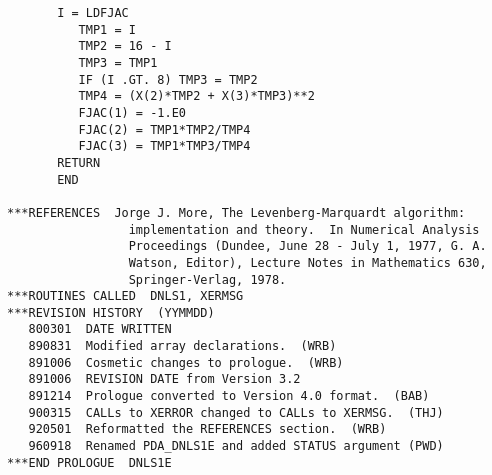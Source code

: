 \begin{verbatim}
       I = LDFJAC
          TMP1 = I
          TMP2 = 16 - I
          TMP3 = TMP1
          IF (I .GT. 8) TMP3 = TMP2
          TMP4 = (X(2)*TMP2 + X(3)*TMP3)**2
          FJAC(1) = -1.E0
          FJAC(2) = TMP1*TMP2/TMP4
          FJAC(3) = TMP1*TMP3/TMP4
       RETURN
       END

***REFERENCES  Jorge J. More, The Levenberg-Marquardt algorithm:
                 implementation and theory.  In Numerical Analysis
                 Proceedings (Dundee, June 28 - July 1, 1977, G. A.
                 Watson, Editor), Lecture Notes in Mathematics 630,
                 Springer-Verlag, 1978.
***ROUTINES CALLED  DNLS1, XERMSG
***REVISION HISTORY  (YYMMDD)
   800301  DATE WRITTEN
   890831  Modified array declarations.  (WRB)
   891006  Cosmetic changes to prologue.  (WRB)
   891006  REVISION DATE from Version 3.2
   891214  Prologue converted to Version 4.0 format.  (BAB)
   900315  CALLs to XERROR changed to CALLs to XERMSG.  (THJ)
   920501  Reformatted the REFERENCES section.  (WRB)
   960918  Renamed PDA_DNLS1E and added STATUS argument (PWD)
***END PROLOGUE  DNLS1E
\end{verbatim}



